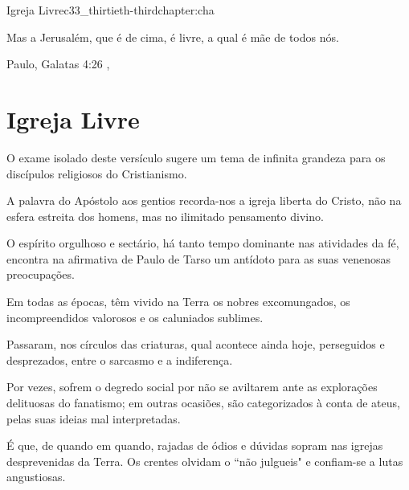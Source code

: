 \begin{chapterpage}{Igreja Livre}{c33_thirtieth-thirdchapter:cha}

\begin{myquotation} Mas a Jerusalém, que é de cima, é livre, a qual é mãe de todos nós.

\par\vspace*{15mm}
\mbox{}\hfill \emdash{}Paulo, Galatas 4:26 
, %
\par\end{myquotation}

\end{chapterpage}



\section{Igreja Livre}\label{c1_basicformatting:sec}

\emdash{}O exame isolado deste versículo sugere um tema de infinita grandeza para os discípulos religiosos do Cristianismo.

\emdash{}A palavra do Apóstolo aos gentios recorda-nos a igreja liberta do Cristo, não na esfera estreita dos homens, mas no ilimitado pensamento divino.

\emdash{}O espírito orgulhoso e sectário, há tanto tempo dominante nas atividades da fé, encontra na afirmativa de Paulo de Tarso um antídoto para as suas venenosas preocupações.

\emdash{}Em todas as épocas, têm vivido na Terra os nobres excomungados, os incompreendidos valorosos e os caluniados sublimes.

\emdash{}Passaram, nos círculos das criaturas, qual acontece ainda hoje, perseguidos e desprezados, entre o sarcasmo e a indiferença.

\emdash{}Por vezes, sofrem o degredo social por não se aviltarem ante as explorações delituosas do fanatismo; em outras ocasiões, são categorizados à conta de ateus, pelas suas ideias mal interpretadas.

\emdash{}É que, de quando em quando, rajadas de ódios e dúvidas sopram nas igrejas desprevenidas da Terra. Os crentes olvidam o ``não julgueis" e confiam-se a lutas angustiosas.

